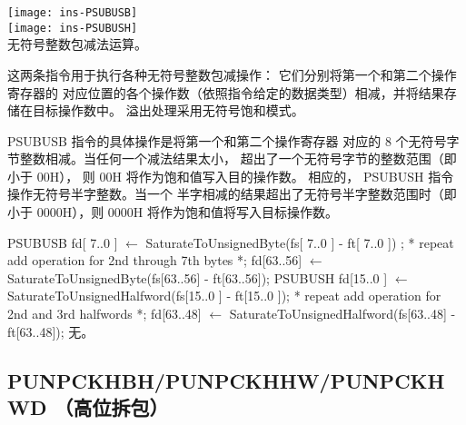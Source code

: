 \begin{instructionblk}
  \texttt{[image: ins-PSUBUSB]} \\
  \texttt{[image: ins-PSUBUSH]} \\
  {无符号整数包减法运算。}
  {这两条指令用于执行各种无符号整数包减操作： 它们分别将第一个和第二个操作寄存器的
  对应位置的各个操作数（依照指令给定的数据类型）相减，并将结果存储在目标操作数中。
  溢出处理采用无符号饱和模式。

  PSUBUSB 指令的具体操作是将第一个和第二个操作寄存器
  对应的 8 个无符号字节整数相减。当任何一个减法结果太小，
  超出了一个无符号字节的整数范围（即小于 00H），
  则 00H 将作为饱和值写入目的操作数。
  相应的， PSUBUSH 指令操作无符号半字整数。当一个
  半字相减的结果超出了无符号半字整数范围时（即小于
  0000H），则 0000H 将作为饱和值将写入目标操作数。}
  {PSUBUSB \narrownewline
  fd[ 7..0 ]  $\leftarrow$ SaturateToUnsignedByte(fs[ 7..0 ] - ft[ 7..0 ]) ; \narrownewline
  * repeat add operation for 2nd through 7th bytes *; \narrownewline
  fd[63..56] $\leftarrow$ SaturateToUnsignedByte(fs[63..56] - ft[63..56]); \narrownewline \narrownewline
  PSUBUSH \narrownewline
  fd[15..0 ] $\leftarrow$ SaturateToUnsignedHalfword(fs[15..0 ] - ft[15..0 ]); \narrownewline
  * repeat add operation for 2nd and 3rd halfwords *; \narrownewline
  fd[63..48] $\leftarrow$ SaturateToUnsignedHalfword(fs[63..48] - ft[63..48]);}
  {无。}
\end{instructionblk}

\subsection{PUNPCKHBH/PUNPCKHHW/PUNPCKHWD （高位拆包）}

